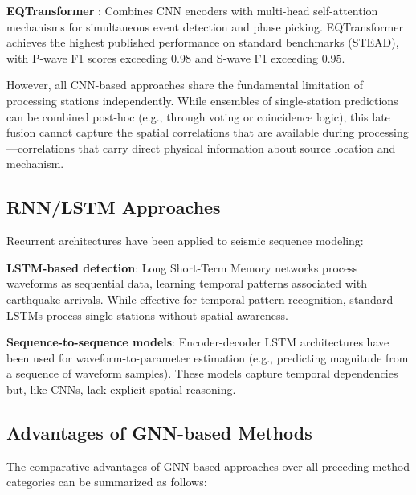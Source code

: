 \documentclass[review,authoryear]{elsarticle}
\begin{document}
\textbf{EQTransformer} \citep{mousavi2020earthquake}: Combines CNN encoders with multi-head self-attention mechanisms for simultaneous event detection and phase picking. EQTransformer achieves the highest published performance on standard benchmarks (STEAD), with P-wave F1 scores exceeding 0.98 and S-wave F1 exceeding 0.95.

However, all CNN-based approaches share the fundamental limitation of processing stations independently. While ensembles of single-station predictions can be combined post-hoc (e.g., through voting or coincidence logic), this late fusion cannot capture the spatial correlations that are available during processing---correlations that carry direct physical information about source location and mechanism.

\subsection{RNN/LSTM Approaches}

Recurrent architectures have been applied to seismic sequence modeling:

\textbf{LSTM-based detection}: Long Short-Term Memory networks process waveforms as sequential data, learning temporal patterns associated with earthquake arrivals. While effective for temporal pattern recognition, standard LSTMs process single stations without spatial awareness.

\textbf{Sequence-to-sequence models}: Encoder-decoder LSTM architectures have been used for waveform-to-parameter estimation (e.g., predicting magnitude from a sequence of waveform samples). These models capture temporal dependencies but, like CNNs, lack explicit spatial reasoning.

\subsection{Advantages of GNN-based Methods}

The comparative advantages of GNN-based approaches over all preceding method categories can be summarized as follows:
\end{document}
